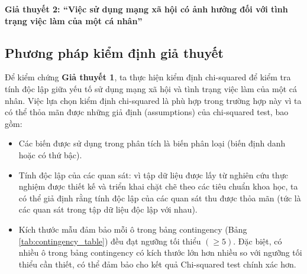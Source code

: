 \textbf{Giả thuyết 2: “Việc sử dụng mạng xã hội có ảnh hưởng đối với tình trạng việc làm của một cá nhân”}

\subsection{Phương pháp kiểm định giả thuyết}
Để kiểm chứng \textbf{Giả thuyết 1}, ta thực hiện kiểm định chi-squared để kiểm tra tính độc lập giữa yếu tố sử dụng mạng xã hội và tình trạng việc làm của một cá nhân. Việc lựa chọn kiểm định chi-squared là phù hợp trong trường hợp này vì ta có thể thỏa mãn được những giả định (assumptions) của chi-squared test, bao gồm: 
\begin{itemize}
    \item Các biến được sử dụng trong phân tích là biến phân loại (biến định danh hoặc có thứ bậc).
    \item Tính độc lập của các quan sát: vì tập dữ liệu được lấy từ nghiên cứu thực nghiệm được thiết kế và triển khai chặt chẽ theo các tiêu chuẩn khoa học, ta có thể giả định rằng tính độc lập của các quan sát thu được thỏa mãn (tức là các quan sát trong tập dữ liệu độc lập với nhau).
    \item Kích thước mẫu đảm bảo mỗi ô trong bảng contingency (Bảng \ref{tab:contingency_table}) đều đạt ngưỡng tối thiểu $(\geq 5)$. Đặc biệt, có nhiều ô trong bảng contingency có kích thước lớn hơn nhiều so với ngưỡng tối thiểu cần thiết, có thể đảm bảo cho kết quả Chi-squared test chính xác hơn.
\end{itemize}

